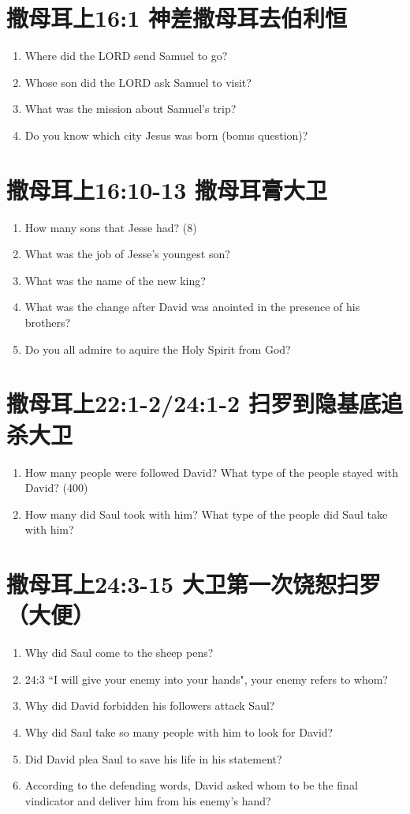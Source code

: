 \section{撒母耳上16:1 神差撒母耳去伯利恒}
\begin{enumerate}[nosep]
\large
\item Where did the LORD send Samuel to go?
\item Whose son did the LORD ask Samuel to visit?
\item What was the mission about Samuel's trip?
\item Do you know which city Jesus was born (bonus question)?
\end{enumerate}

\section{撒母耳上16:10-13 撒母耳膏大卫}
\begin{enumerate}[nosep]
\large
\item How many sons that Jesse had? (8)
\item What was the job of Jesse's youngest son?
\item What was the name of the new king?
\item What was the change after David was anointed in the presence of his brothers?
\item Do you all admire to aquire the Holy Spirit from God?
\end{enumerate}

\section{撒母耳上22:1-2/24:1-2 扫罗到隐基底追杀大卫}
\begin{enumerate}[nosep]
\large
\item How many people were followed David? What type of the people stayed with David? (400)
\item How many did Saul took with him? What type of the people did Saul take with him? 
\end{enumerate}

\section{撒母耳上24:3-15 大卫第一次饶恕扫罗（大便）}
\begin{enumerate}[nosep]
\large
\item Why did Saul come to the sheep pens?
\item 24:3 “I will give your enemy into your hands", your enemy refers to whom?
\item Why did David forbidden his followers attack Saul?
\item Why did Saul take so many people with him to look for David?
\item Did David plea Saul to save his life in his statement?
\item According to the defending words, David asked whom to be the final vindicator and deliver him from his enemy's hand?
\end{enumerate}


